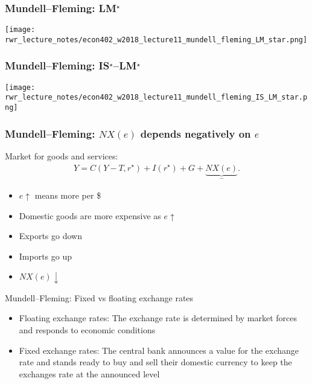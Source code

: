 \documentclass[presentation,dvipsnames]{beamer}
\renewcommand{\pounds}{\text{\textsterling}{ }}
\begin{document}
\begin{frame}
\frametitle{Mundell--Fleming: LM$^{\star}$}
\centering
\texttt{[image: rwr\_lecture\_notes/econ402\_w2018\_lecture11\_mundell\_fleming\_LM\_star.png]}
\end{frame}

\begin{frame}
\frametitle{Mundell--Fleming: IS$^{\star}$--LM$^{\star}$}
\centering
\texttt{[image: rwr\_lecture\_notes/econ402\_w2018\_lecture11\_mundell\_fleming\_IS\_LM\_star.png]}
\end{frame}




\begin{frame}
\frametitle{Mundell--Fleming: $NX(e)$ depends negatively on $e$}
Market for goods and services:
\begin{align*}
Y = C(Y-T, r^{\star})  + I(r^{\star}) + G + \underbrace{NX(e)}_{-}.
\end{align*}
\begin{itemize}[label={--}]
\item $e \uparrow$ means more \pounds per \$
\item Domestic goods are more expensive as $e \uparrow$
\item Exports go down
\item Imports go up
\item $NX(e) \downarrow$
\end{itemize}
\end{frame}

\begin{frame}[label=sec-6-3]{Mundell--Fleming: Fixed vs floating exchange rates}
\begin{itemize}[label={--}]
\item Floating exchange rates: The exchange rate is determined by market forces and responds to economic conditions
\item Fixed exchange rates: The central bank announces a value for the exchange rate and stands ready to buy and sell their domestic currency to keep the exchanges rate at the announced level
\end{itemize}
\end{frame}
\end{document}
